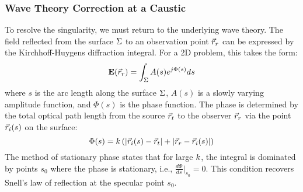 \documentclass{article}
\begin{document}
\subsubsection{Wave Theory Correction at a Caustic}
To resolve the singularity, we must return to the underlying wave theory. The field reflected from the surface $\Sigma$ to an observation point $\vec{r}_r$ can be expressed by the Kirchhoff-Huygens diffraction integral. For a 2D problem, this takes the form:
\begin{equation}
    \mathbf{E}(\vec{r}_r) = \int_{\Sigma} A(s) e^{j \Phi(s)} ds
    \label{eq:kirchhoffIntegral}
\end{equation}
where $s$ is the arc length along the surface $\Sigma$, $A(s)$ is a slowly varying amplitude function, and $\Phi(s)$ is the phase function. The phase is determined by the total optical path length from the source $\vec{r}_t$ to the observer $\vec{r}_r$ via the point $\vec{r}_i(s)$ on the surface:
\begin{equation}
    \Phi(s) = k \left( |\vec{r}_i(s) - \vec{r}_t| + |\vec{r}_r - \vec{r}_i(s)| \right)
\end{equation}
The method of stationary phase states that for large $k$, the integral is dominated by points $s_0$ where the phase is stationary, i.e., $\frac{d\Phi}{ds} \big|_{s_0} = 0$. This condition recovers Snell's law of reflection at the specular point $s_0$.
\end{document}
